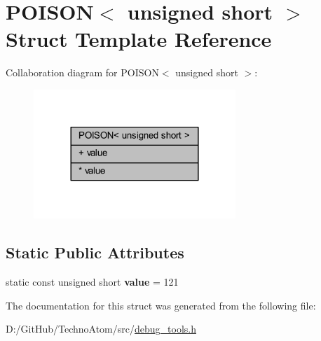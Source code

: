 \hypertarget{struct_p_o_i_s_o_n_3_01unsigned_01short_01_4}{}\section{P\+O\+I\+S\+ON$<$ unsigned short $>$ Struct Template Reference}
\label{struct_p_o_i_s_o_n_3_01unsigned_01short_01_4}


Collaboration diagram for P\+O\+I\+S\+ON$<$ unsigned short $>$\+:
\nopagebreak
\begin{figure}[H]
\begin{center}
\leavevmode
\includegraphics[width=216pt]{struct_p_o_i_s_o_n_3_01unsigned_01short_01_4__coll__graph}
\end{center}
\end{figure}
\subsection*{Static Public Attributes}
\textbf{ }\par
\begin{DoxyCompactItemize}
\item 
\mbox{\label{struct_p_o_i_s_o_n_3_01unsigned_01short_01_4_a0a82e6d7b747a1a3eeeafa834ae87029}} 
static const unsigned short {\bfseries value} = 121
\end{DoxyCompactItemize}



The documentation for this struct was generated from the following file\+:\begin{DoxyCompactItemize}
\item 
D\+:/\+Git\+Hub/\+Techno\+Atom/src/\hyperlink{debug__tools_8h}{debug\+\_\+tools.\+h}\end{DoxyCompactItemize}
